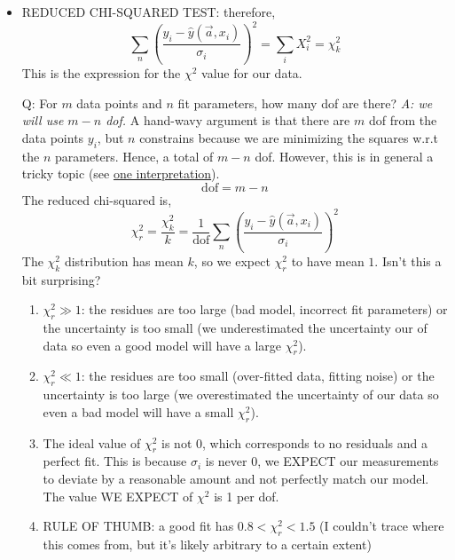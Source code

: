 \documentclass[12pt]{article}
\numberwithin{equation}{section}
\begin{document}
\begin{itemize}
\item REDUCED CHI-SQUARED TEST: therefore,
\begin{equation}
	\sum_n 	\left(\frac{y_i - \hat{y}(\vec{a}, x_i) }{\sigma_i}\right)^2 = \sum_i X_i^2 = \chi^2_k
\end{equation}
This is the expression for the $ \chi^2 $ value for our data.

Q: For $ m $ data points and $ n $ fit parameters, how many dof are there? \textit{A: we will use $ m-n$ dof.} A hand-wavy argument is that there are $ m $ dof from the data points $ y_i $, but $ n $ constrains because we are minimizing the squares w.r.t the $ n $ parameters. Hence, a total of $ m-n $ dof. However, this is in general a tricky topic (see \href{https://arxiv.org/abs/1012.3754}{one interpretation}).
\begin{equation}
		\text{dof} = m-n
\end{equation}
The reduced chi-squared is,
\begin{equation}
		\boxed{ \chi^2_r = \frac{\chi^2_k}{k} = \frac{1}{\text{dof}}\sum_n 	\left(\frac{y_i - \hat{y}(\vec{a}, x_i) }{\sigma_i}\right)^2}
\end{equation}
The $ \chi^2_k $ distribution has mean $ k $, so we expect $ \chi^2_r $ to have mean $ 1 $. Isn't this a bit surprising?
\begin{enumerate}
	\item $ \chi^2_r \gg 1$: the residues are too large (bad model, incorrect fit parameters) or the uncertainty is too small (we underestimated the uncertainty our of data so even a good model will have a large $ \chi^2_r $).
	\item $ \chi^2_r \ll 1$: the residues are too small (over-fitted data, fitting noise) or the uncertainty is too large (we overestimated the uncertainty of our data so even a bad model will have a small $ \chi^2_r $).
	\item The ideal value of $ \chi^2_r $ is not 0, which corresponds to no residuals and a perfect fit. This is because $ \sigma_i $ is never 0, we EXPECT our measurements to deviate by a reasonable amount and not perfectly match our model. The value WE EXPECT of $\chi^2  $ is 1 per dof.
	\item RULE OF THUMB: a good fit has $ 0.8<\chi^2_r <1.5 $ (I couldn't trace where this comes from, but it's likely arbitrary to a certain extent)
\end{enumerate}


\end{itemize}
\end{document}
